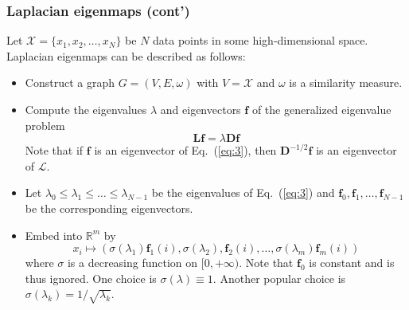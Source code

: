 \documentclass[professionalfonts, hyperref={pdfpagelabels=false,
  colorlinks=true, linkcolor=purple}]{beamer}
\begin{document}
\begin{frame}
  \frametitle{Laplacian eigenmaps (cont')}
  Let $\mathcal{X} = \{x_1,x_2,\dots,x_N\}$ be $N$ data points in some
  high-dimensional space. Laplacian eigenmaps can be described as
  follows:
  \begin{itemize}
  \item Construct a graph $G = (V,E,\omega)$ with $V = \mathcal{X}$
    and $\omega$ is a similarity measure.
  \item Compute the eigenvalues $\lambda$ and eigenvectors
    $\bm{f}$ of the generalized eigenvalue problem
    \begin{equation}
      \label{eq:3}
      \bm{Lf} = \lambda \bm{Df}
    \end{equation}
    Note that if $\bm{f}$ is an eigenvector of Eq.~(\ref{eq:3}), then
    $\bm{D}^{-1/2}\bm{f}$ is an eigenvector of $\mathcal{L}$.
  \item Let $\lambda_0 \leq \lambda_1 \leq \dots \leq \lambda_{N-1}$ be
    the eigenvalues of Eq.~(\ref{eq:3}) and $\bm{f}_0, \bm{f}_1,
    \dots, \bm{f}_{N-1}$ be the corresponding eigenvectors. 
  \item Embed into $\mathbb{R}^{m}$ by
    \begin{equation}
      \label{eq:4}
      x_i \mapsto (\sigma(\lambda_1) \bm{f}_{1}(i), \sigma(\lambda_2),
      \bm{f}_{2}(i), \dots, \sigma(\lambda_m) \bm{f}_{m}(i))
    \end{equation}
    where $\sigma$ is a decreasing function on $[0,+\infty)$.  Note
    that $\bm{f}_0$ is constant and is thus ignored. One choice is
    $\sigma(\lambda) \equiv 1$. Another popular choice is
    $\sigma(\lambda_k) = 1/\sqrt{\lambda_k}$.
  \end{itemize}
\end{frame}

\end{document}
